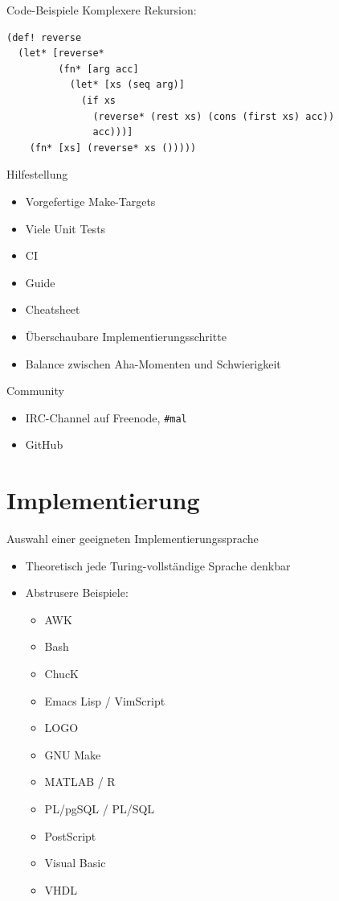 \documentclass[presentation]{beamer}
\begin{document}
\begin{frame}[fragile,label=sec-2-6]{Code-Beispiele}
 Komplexere Rekursion:

\begin{verbatim}
(def! reverse
  (let* [reverse*
         (fn* [arg acc]
           (let* [xs (seq arg)]
             (if xs
               (reverse* (rest xs) (cons (first xs) acc))
               acc)))]
    (fn* [xs] (reverse* xs ()))))
\end{verbatim}
\end{frame}

\begin{frame}[label=sec-2-7]{Hilfestellung}
\begin{itemize}
\item Vorgefertige Make-Targets
\item Viele Unit Tests
\item CI
\item Guide
\item Cheatsheet
\item Überschaubare Implementierungsschritte
\item Balance zwischen Aha-Momenten und Schwierigkeit
\end{itemize}
\end{frame}

\begin{frame}[fragile,label=sec-2-8]{Community}
 \begin{itemize}
\item IRC-Channel auf Freenode, \texttt{\#mal}
\item GitHub
\end{itemize}
\end{frame}

\section{Implementierung}
\label{sec-3}

\begin{frame}[label=sec-3-1]{Auswahl einer geeigneten Implementierungssprache}
\begin{itemize}
\item Theoretisch jede Turing-vollständige Sprache denkbar
\item Abstrusere Beispiele:
\begin{itemize}
\item AWK
\item Bash
\item ChucK
\item Emacs Lisp / VimScript
\item LOGO
\item GNU Make
\item MATLAB / R
\item PL/pgSQL / PL/SQL
\item PostScript
\item Visual Basic
\item VHDL
\end{itemize}
\end{itemize}
\end{frame}
\end{document}
